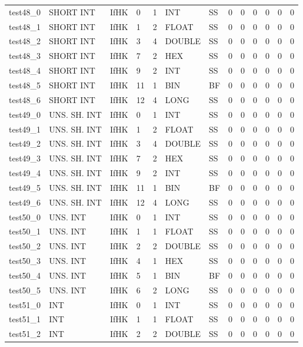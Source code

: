 \begin{longtable}{|l|l|l|p{0.5cm}|p{0.5cm}|l|p{0.5cm}|p{0.5cm}|p{0.5cm}|l|l|p{0.5cm}|l|}
test48\_0 & SHORT INT & IfHK & 0 & 1 & INT & SS & 0 & 0 & 0 & 0 & 0 & 0 \\
test48\_1 & SHORT INT & IfHK & 1 & 2 & FLOAT & SS & 0 & 0 & 0 & 0 & 0 & 0 \\
test48\_2 & SHORT INT & IfHK & 3 & 4 & DOUBLE & SS & 0 & 0 & 0 & 0 & 0 & 0 \\
test48\_3 & SHORT INT & IfHK & 7 & 2 & HEX & SS & 0 & 0 & 0 & 0 & 0 & 0 \\
test48\_4 & SHORT INT & IfHK & 9 & 2 & INT & SS & 0 & 0 & 0 & 0 & 0 & 0 \\
test48\_5 & SHORT INT & IfHK & 11 & 1 & BIN & BF & 0 & 0 & 0 & 0 & 0 & 0 \\
test48\_6 & SHORT INT & IfHK & 12 & 4 & LONG & SS & 0 & 0 & 0 & 0 & 0 & 0 \\
test49\_0 & UNS. SH. INT & IfHK & 0 & 1 & INT & SS & 0 & 0 & 0 & 0 & 0 & 0 \\
test49\_1 & UNS. SH. INT & IfHK & 1 & 2 & FLOAT & SS & 0 & 0 & 0 & 0 & 0 & 0 \\
test49\_2 & UNS. SH. INT & IfHK & 3 & 4 & DOUBLE & SS & 0 & 0 & 0 & 0 & 0 & 0 \\
test49\_3 & UNS. SH. INT & IfHK & 7 & 2 & HEX & SS & 0 & 0 & 0 & 0 & 0 & 0 \\
test49\_4 & UNS. SH. INT & IfHK & 9 & 2 & INT & SS & 0 & 0 & 0 & 0 & 0 & 0 \\
test49\_5 & UNS. SH. INT & IfHK & 11 & 1 & BIN & BF & 0 & 0 & 0 & 0 & 0 & 0 \\
test49\_6 & UNS. SH. INT & IfHK & 12 & 4 & LONG & SS & 0 & 0 & 0 & 0 & 0 & 0 \\
test50\_0 & UNS. INT & IfHK & 0 & 1 & INT & SS & 0 & 0 & 0 & 0 & 0 & 0 \\
test50\_1 & UNS. INT & IfHK & 1 & 1 & FLOAT & SS & 0 & 0 & 0 & 0 & 0 & 0 \\
test50\_2 & UNS. INT & IfHK & 2 & 2 & DOUBLE & SS & 0 & 0 & 0 & 0 & 0 & 0 \\
test50\_3 & UNS. INT & IfHK & 4 & 1 & HEX & SS & 0 & 0 & 0 & 0 & 0 & 0 \\
test50\_4 & UNS. INT & IfHK & 5 & 1 & BIN & BF & 0 & 0 & 0 & 0 & 0 & 0 \\
test50\_5 & UNS. INT & IfHK & 6 & 2 & LONG & SS & 0 & 0 & 0 & 0 & 0 & 0 \\
test51\_0 & INT & IfHK & 0 & 1 & INT & SS & 0 & 0 & 0 & 0 & 0 & 0 \\
test51\_1 & INT & IfHK & 1 & 1 & FLOAT & SS & 0 & 0 & 0 & 0 & 0 & 0 \\
test51\_2 & INT & IfHK & 2 & 2 & DOUBLE & SS & 0 & 0 & 0 & 0 & 0 & 0 \\

\end{longtable}
